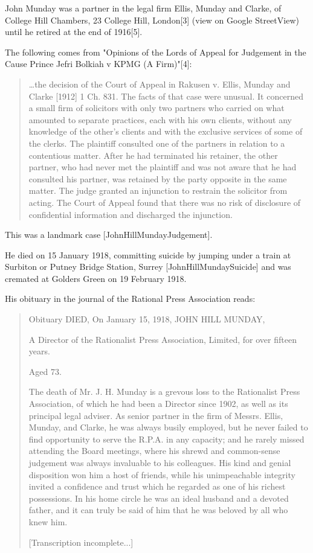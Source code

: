 John Munday was a partner in the legal firm Ellis, Munday and Clarke, of College Hill Chambers, 23 College Hill, London[3] (view on Google StreetView) until he retired at the end of 1916[5].

The following comes from "Opinions of the Lords of Appeal for Judgement in the Cause Prince Jefri Bolkiah v KPMG (A Firm)"[4]:

\begin{quotation}
\dots the decision of the Court of Appeal in Rakusen v. Ellis, Munday and Clarke [1912] 1 Ch. 831. The facts of that case were unusual. It concerned a small firm of solicitors with only two partners who carried on what amounted to separate practices, each with his own clients, without any knowledge of the other's clients and with the exclusive services of some of the clerks. The plaintiff consulted one of the partners in relation to a contentious matter. After he had terminated his retainer, the other partner, who had never met the plaintiff and was not aware that he had consulted his partner, was retained by the party opposite in the same matter. The judge granted an injunction to restrain the solicitor from acting. The Court of Appeal found that there was no risk of disclosure of confidential information and discharged the injunction. 
\end{quotation}
This was a landmark case [JohnHillMundayJudgement].

He died on 15 January 1918, committing suicide by jumping under a train at Surbiton or Putney Bridge Station, Surrey [JohnHillMundaySuicide] and was cremated at Golders Green on 19 February 1918.


His obituary in the journal of the Rational Press Association reads:

\begin{quotation}
Obituary
DIED,
On January 15, 1918,
JOHN HILL MUNDAY,

A Director of the Rationalist Press Association, Limited, for over fifteen years.

Aged 73.

The death of Mr. J. H. Munday is a grevous loss to the Rationalist Press Association, of which he had been a Director since 1902, as well as its principal legal adviser. As senior partner in the firm of Messrs. Ellis, Munday, and Clarke, he was always busily employed, but he never failed to find opportunity to serve the R.P.A. in any capacity; and he rarely missed attending the Board meetings, where his shrewd and common-sense judgement was always invaluable to his colleagues. His kind and genial disposition won him a host of friends, while his unimpeachable integrity invited a confidence and trust which he regarded as one of his richest possessions. In his home circle he was an ideal husband and a devoted father, and it can truly be said of him that he was beloved by all who knew him.

[Transcription incomplete...]
\end{quotation}

